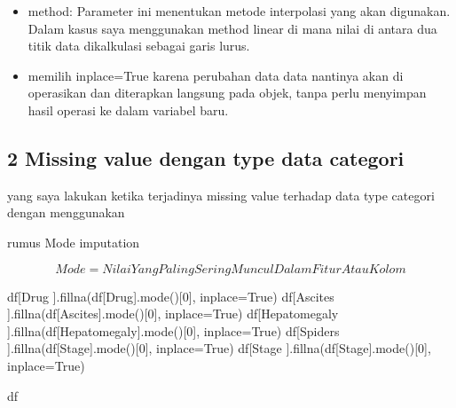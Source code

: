 \documentclass[
  letterpaper,
]{krantz}
\makeatletter
\newenvironment{Shaded}{\begin{snugshade}}{\end{snugshade}}
\newcommand{\DecValTok}[1]{\textcolor[rgb]{0.68,0.00,0.00}{#1}}
\newcommand{\NormalTok}[1]{\textcolor[rgb]{0.00,0.23,0.31}{#1}}
\newcommand{\OperatorTok}[1]{\textcolor[rgb]{0.37,0.37,0.37}{#1}}
\newcommand{\StringTok}[1]{\textcolor[rgb]{0.13,0.47,0.30}{#1}}
\newcommand{\VariableTok}[1]{\textcolor[rgb]{0.07,0.07,0.07}{#1}}
\providecommand{\tightlist}{%
  \setlength{\itemsep}{0pt}\setlength{\parskip}{0pt}}\usepackage{longtable,booktabs,array}
\newenvironment{kframe}{%
\medskip{}
\setlength{\fboxsep}{.8em}
 \def\at@end@of@kframe{}%
 \ifinner\ifhmode%
  \def\at@end@of@kframe{\end{minipage}}%
  \begin{minipage}{\columnwidth}%
 \fi\fi%
 \def\FrameCommand##1{\hskip\@totalleftmargin \hskip-\fboxsep
 \colorbox{shadecolor}{##1}\hskip-\fboxsep
     \hskip-\linewidth \hskip-\@totalleftmargin \hskip\columnwidth}%
 \MakeFramed {\advance\hsize-\width
   \@totalleftmargin\z@ \linewidth\hsize
   \@setminipage}}%
 {\par\unskip\endMakeFramed%
 \at@end@of@kframe}
\renewenvironment{Shaded}{\begin{kframe}}{\end{kframe}}
\makeatother
\begin{document}
\begin{itemize}
\tightlist
\item
  method: Parameter ini menentukan metode interpolasi yang akan
  digunakan. Dalam kasus saya menggunakan method linear di mana nilai di
  antara dua titik data dikalkulasi sebagai garis lurus.
\item
  memilih inplace=True karena perubahan data data nantinya akan di
  operasikan dan diterapkan langsung pada objek, tanpa perlu menyimpan
  hasil operasi ke dalam variabel baru.
\end{itemize}

\hypertarget{missing-value-dengan-type-data-categori}{%
\subsection*{2 Missing value dengan type data
categori}\label{missing-value-dengan-type-data-categori}}

yang saya lakukan ketika terjadinya missing value terhadap data type
categori dengan menggunakan

rumus Mode imputation

\[
Mode=Nilai Yang Paling Sering Muncul Dalam Fitur Atau Kolom
\]

\begin{Shaded}
\begin{Highlighting}[]
\NormalTok{df[}\StringTok{\textquotesingle{}Drug\textquotesingle{}}\NormalTok{   ].fillna(df[}\StringTok{\textquotesingle{}Drug\textquotesingle{}}\NormalTok{].mode()[}\DecValTok{0}\NormalTok{], inplace}\OperatorTok{=}\VariableTok{True}\NormalTok{)}
\NormalTok{df[}\StringTok{\textquotesingle{}Ascites\textquotesingle{}}\NormalTok{    ].fillna(df[}\StringTok{\textquotesingle{}Ascites\textquotesingle{}}\NormalTok{].mode()[}\DecValTok{0}\NormalTok{], inplace}\OperatorTok{=}\VariableTok{True}\NormalTok{)}
\NormalTok{df[}\StringTok{\textquotesingle{}Hepatomegaly\textquotesingle{}}\NormalTok{   ].fillna(df[}\StringTok{\textquotesingle{}Hepatomegaly\textquotesingle{}}\NormalTok{].mode()[}\DecValTok{0}\NormalTok{], inplace}\OperatorTok{=}\VariableTok{True}\NormalTok{)}
\NormalTok{df[}\StringTok{\textquotesingle{}Spiders\textquotesingle{}}\NormalTok{    ].fillna(df[}\StringTok{\textquotesingle{}Stage\textquotesingle{}}\NormalTok{].mode()[}\DecValTok{0}\NormalTok{], inplace}\OperatorTok{=}\VariableTok{True}\NormalTok{)}
\NormalTok{df[}\StringTok{\textquotesingle{}Stage\textquotesingle{}}\NormalTok{  ].fillna(df[}\StringTok{\textquotesingle{}Stage\textquotesingle{}}\NormalTok{].mode()[}\DecValTok{0}\NormalTok{], inplace}\OperatorTok{=}\VariableTok{True}\NormalTok{)}

\NormalTok{df}
\end{Highlighting}
\end{Shaded}
\end{document}
